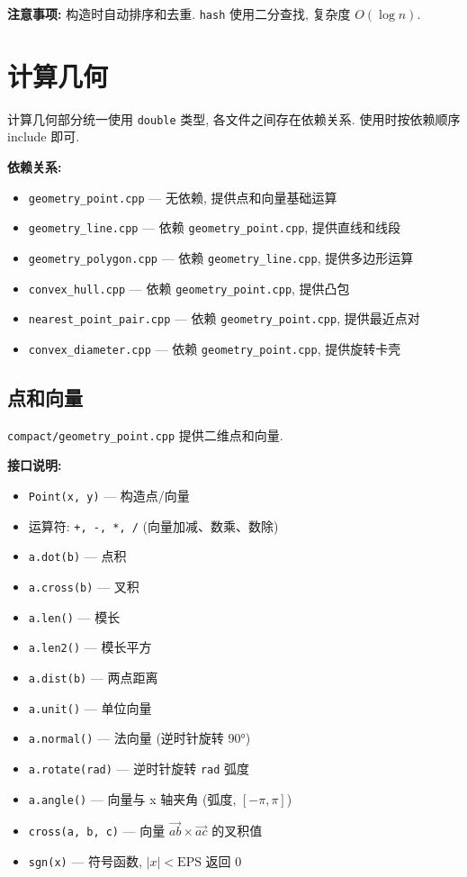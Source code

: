 \documentclass[a4paper]{ctexbook}
\begin{document}
\textbf{注意事项:} 构造时自动排序和去重. \texttt{hash} 使用二分查找, 复杂度 $O(\log n)$.



\section{计算几何}

计算几何部分统一使用 \texttt{double} 类型, 各文件之间存在依赖关系. 使用时按依赖顺序 include 即可.

\textbf{依赖关系:}
\begin{itemize}
	\item \texttt{geometry\_point.cpp} — 无依赖, 提供点和向量基础运算
	\item \texttt{geometry\_line.cpp} — 依赖 \texttt{geometry\_point.cpp}, 提供直线和线段
	\item \texttt{geometry\_polygon.cpp} — 依赖 \texttt{geometry\_line.cpp}, 提供多边形运算
	\item \texttt{convex\_hull.cpp} — 依赖 \texttt{geometry\_point.cpp}, 提供凸包
	\item \texttt{nearest\_point\_pair.cpp} — 依赖 \texttt{geometry\_point.cpp}, 提供最近点对
	\item \texttt{convex\_diameter.cpp} — 依赖 \texttt{geometry\_point.cpp}, 提供旋转卡壳
\end{itemize}

\subsection{点和向量}

\texttt{compact/geometry\_point.cpp} 提供二维点和向量.

\textbf{接口说明:}
\begin{itemize}
	\item \texttt{Point(x, y)} — 构造点/向量
	\item 运算符: \texttt{+, -, *, /} (向量加减、数乘、数除)
	\item \texttt{a.dot(b)} — 点积
	\item \texttt{a.cross(b)} — 叉积
	\item \texttt{a.len()} — 模长
	\item \texttt{a.len2()} — 模长平方
	\item \texttt{a.dist(b)} — 两点距离
	\item \texttt{a.unit()} — 单位向量
	\item \texttt{a.normal()} — 法向量 (逆时针旋转 90°)
	\item \texttt{a.rotate(rad)} — 逆时针旋转 \texttt{rad} 弧度
	\item \texttt{a.angle()} — 向量与 x 轴夹角 (弧度, $[-\pi, \pi]$)
	\item \texttt{cross(a, b, c)} — 向量 $\vec{ab} \times \vec{ac}$ 的叉积值
	\item \texttt{sgn(x)} — 符号函数, $|x| < \text{EPS}$ 返回 0
\end{itemize}
\end{document}
